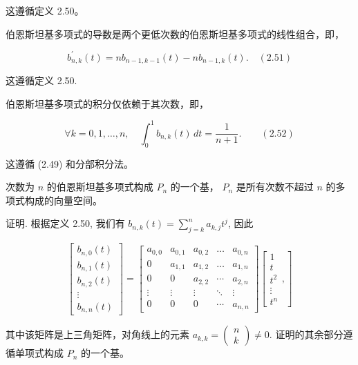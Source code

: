 \documentclass[a4paper]{ctexart}
\begin{document}
{ 这遵循定义 2.50。

 伯恩斯坦基多项式的导数是两个更低次数的伯恩斯坦基多项式的线性组合，即，

\[ b_{n, k}^{\prime}(t) = n b_{n-1, k-1}(t) - n b_{n-1, k}(t). \quad (2.51) \]

 这遵循定义 2.50.

 伯恩斯坦基多项式的积分仅依赖于其次数，即，

\[ \forall k=0,1,\ldots, n,\quad \int_{0}^{1} b_{n, k}(t) \, dt = \frac{1}{n+1}. \qquad (2.52) \]

 这遵循 (2.49) 和分部积分法。

 次数为 \(n\) 的伯恩斯坦基多项式构成 \(P_{n}\) 的一个基，
\(P_{n}\) 是所有次数不超过 \(n\) 的多项式构成的向量空间。

{\noindent 证明.} 根据定义 2.50, 我们有 \(b_{n, k}(t) = \sum_{j=k}^{n} a_{k, j} t^{j}\), 因此

\[
\left[
\begin{array}{c}
b_{n, 0}(t)\\
b_{n, 1}(t)\\
b_{n, 2}(t)\\
\vdots\\
b_{n, n}(t)
\end{array}
\right]
=
\left[
\begin{array}{cccccc}
a_{0,0} & a_{0,1} & a_{0,2} & \ldots & a_{0,n}\\
0 & a_{1,1} & a_{1,2} & \ldots & a_{1,n}\\
0 & 0 & a_{2,2} & \cdots & a_{2,n}\\
\vdots & \vdots & \vdots & \ddots & \vdots\\
0 & 0 & 0 & \cdots & a_{n, n}
\end{array}
\right]
\left[
\begin{array}{c}
1\\
t\\
t^{2}\\
\vdots\\
t^{n}
\end{array},
\right]
\]

其中该矩阵是上三角矩阵，对角线上的元素 \(a_{k, k} = \left(\begin{array}{l}n\\ k\end{array}\right) \neq 0\). 
证明的其余部分遵循单项式构成 \(P_{n}\) 的一个基。

}
\end{document}
